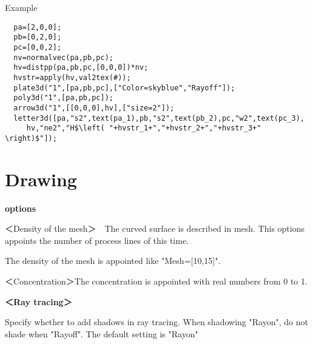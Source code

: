\documentclass[papersize,a4paper,12pt]{article}
\begin{document}
\begin{description}
Example
\begin{verbatim}
  pa=[2,0,0];
  pb=[0,2,0];
  pc=[0,0,2];
  nv=normalvec(pa,pb,pc);
  hv=distpp(pa,pb,pc,[0,0,0])*nv;
  hvstr=apply(hv,val2tex(#));
  plate3d("1",[pa,pb,pc],["Color=skyblue","Rayoff"]);
  poly3d("1",[pa,pb,pc]);
  arrow3d("1",[[0,0,0],hv],["size=2"]);
  letter3d([pa,"s2",text(pa_1),pb,"s2",text(pb_2),pc,"w2",text(pc_3),
     hv,"ne2","H$\left( "+hvstr_1+","+hvstr_2+","+hvstr_3+" \right)$"]);
\end{verbatim}


\end{description}
\newpage

\section{Drawing}

\textbf{options}
 
＜Density of the mesh＞　The curved surface is described in mesh. This options appoints the number of process lines of this time.

The density of the mesh is appointed like "Mesh=[10,15]".

＜Concentration＞The concentration is appointed with real numbers from 0 to 1. 

\textbf{＜Ray tracing＞} 

Specify whether to add shadows in ray tracing. When shadowing "Rayon", do not shade when "Rayoff". The default setting is "Rayon"
\end{document}
